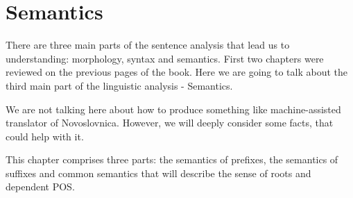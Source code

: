 \chapter{Semantics}

There are three main parts of the sentence analysis that lead us to understanding: morphology, syntax and semantics. First two chapters were reviewed on the previous pages of the book. Here we are going to talk about the third main part of the linguistic analysis - Semantics.

We are not talking here about how to produce something like machine-assisted translator of Novoslovnica. However, we will deeply consider some facts, that could help with it. 

This chapter comprises three parts: the semantics of prefixes, the semantics of suffixes and common semantics that will describe the sense of roots and dependent POS.



